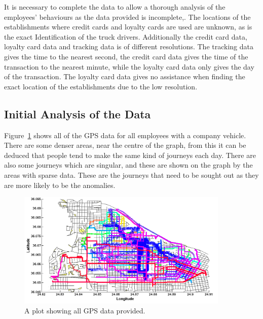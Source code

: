  It is necessary to complete the data to allow a thorough analysis of the employees’ behaviours as the data provided is incomplete,. The locations of the establishments where credit cards and loyalty cards are used are unknown, as is the exact Identification of the truck drivers. Additionally the credit card data, loyalty card data and tracking data is of different resolutions. The tracking data gives the time to the nearest second, the credit card data gives the time of the transaction to the nearest minute, while the loyalty card data only gives the day of the transaction. The loyalty card data gives no assistance when finding the exact location of the establishments due to the low resolution. \\

\subsection{Initial Analysis of the Data}
\label{sec:initialanalysis}

Figure~\ref{fig:gpsdata} shows all of the GPS data for all employees with a company vehicle. There are some denser areas, near the centre of the graph, from this it can be deduced that people tend to make the same kind of journeys each day. There are also some journeys which are singular, and these are shown on the graph by the areas with sparse data. These are the journeys that need to be sought out as they are more likely to be the anomalies. \\

\begin{figure}[!ht]
\centering
\includegraphics[width=0.9\textwidth]{gpsdata.png}
\caption{\label{fig:gpsdata}A plot showing all GPS data provided.}
\end{figure}


